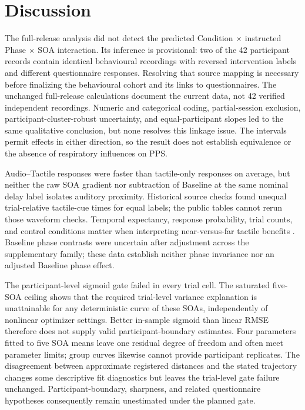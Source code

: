 \section{Discussion}

The full-release analysis did not detect the predicted Condition $\times$ instructed Phase $\times$ SOA interaction. Its inference is provisional: two of the 42 participant records contain identical behavioural recordings with reversed intervention labels and different questionnaire responses. Resolving that source mapping is necessary before finalizing the behavioural cohort and its links to questionnaires. The unchanged full-release calculations document the current data, not 42 verified independent recordings. Numeric and categorical coding, partial-session exclusion, participant-cluster-robust uncertainty, and equal-participant slopes led to the same qualitative conclusion, but none resolves this linkage issue. The intervals permit effects in either direction, so the result does not establish equivalence or the absence of respiratory influences on PPS.

Audio--Tactile responses were faster than tactile-only responses on average, but neither the raw SOA gradient nor subtraction of Baseline at the same nominal delay label isolates auditory proximity. Historical source checks found unequal trial-relative tactile-cue times for equal labels; the public tables cannot rerun those waveform checks. Temporal expectancy, response probability, trial counts, and control conditions matter when interpreting near-versus-far tactile benefits \citep{holmes2020sounds}. Baseline phase contrasts were uncertain after adjustment across the supplementary family; these data establish neither phase invariance nor an adjusted Baseline phase effect.

The participant-level sigmoid gate failed in every trial cell. The saturated five-SOA ceiling shows that the required trial-level variance explanation is unattainable for any deterministic curve of these SOAs, independently of nonlinear optimizer settings. Better in-sample sigmoid than linear RMSE therefore does not supply valid participant-boundary estimates. Four parameters fitted to five SOA means leave one residual degree of freedom and often meet parameter limits; group curves likewise cannot provide participant replicates. The disagreement between approximate registered distances and the stated trajectory changes some descriptive fit diagnostics but leaves the trial-level gate failure unchanged. Participant-boundary, sharpness, and related questionnaire hypotheses consequently remain unestimated under the planned gate.

